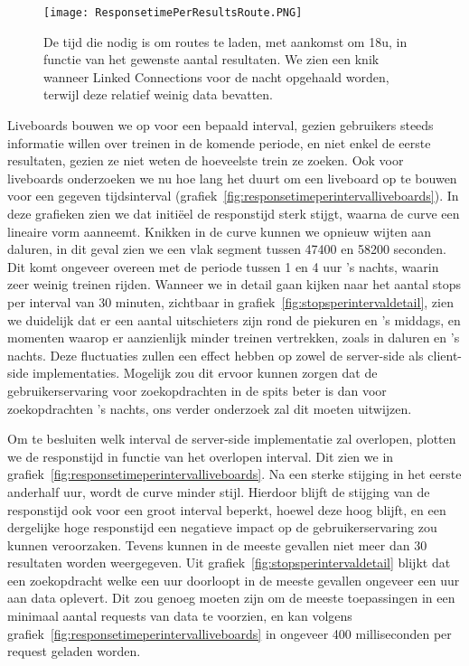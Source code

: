 \begin{figure}[h]
	\centering
	\texttt{[image: ResponsetimePerResultsRoute.PNG]}
	\caption[Laadtijd routes in functie van aantal resultaten]{De tijd die nodig is om routes te laden, met aankomst om 18u, in functie van het gewenste aantal resultaten. We zien een knik wanneer Linked Connections voor de nacht opgehaald worden, terwijl deze relatief weinig data bevatten.}
	\label{fig:responsetimeperresultsroute}
\end{figure}

Liveboards bouwen we op voor een bepaald interval, gezien gebruikers steeds informatie willen over treinen in de komende periode, en niet enkel de eerste resultaten, gezien ze niet weten de hoeveelste trein ze zoeken. Ook voor liveboards onderzoeken we nu hoe lang het duurt om een liveboard op te bouwen voor een gegeven tijdsinterval (grafiek~\ref{fig:responsetimeperintervalliveboards}). In deze grafieken zien we dat initiëel de responstijd sterk stijgt, waarna de curve een lineaire vorm aanneemt. Knikken in de curve kunnen we opnieuw wijten aan daluren, in dit geval zien we een vlak segment tussen 47400 en 58200 seconden. Dit komt ongeveer overeen met de periode tussen 1 en 4 uur 's nachts, waarin zeer weinig treinen rijden. Wanneer we in detail gaan kijken naar het aantal stops per interval van 30 minuten, zichtbaar in grafiek~\ref{fig:stopsperintervaldetail}, zien we duidelijk dat er een aantal uitschieters zijn rond de piekuren en 's middags, en momenten waarop er aanzienlijk minder treinen vertrekken, zoals in daluren en 's nachts. Deze fluctuaties zullen een effect hebben op zowel de server-side als client-side implementaties. Mogelijk zou dit ervoor kunnen zorgen dat de gebruikerservaring voor zoekopdrachten in de spits beter is dan voor zoekopdrachten 's nachts, ons verder onderzoek zal dit moeten uitwijzen.

Om te besluiten welk interval de server-side implementatie zal overlopen, plotten we de responstijd in functie van het overlopen interval. Dit zien we in grafiek~\ref{fig:responsetimeperintervalliveboards}. Na een sterke stijging in het eerste anderhalf uur, wordt de curve minder stijl. Hierdoor blijft de stijging van de responstijd ook voor een groot interval beperkt, hoewel deze hoog blijft, en een dergelijke hoge responstijd een negatieve impact op de gebruikerservaring zou kunnen veroorzaken. Tevens kunnen in de meeste gevallen niet meer dan 30 resultaten worden weergegeven. Uit grafiek~\ref{fig:stopsperintervaldetail} blijkt dat een zoekopdracht welke een uur doorloopt in de meeste gevallen ongeveer een uur aan data oplevert. Dit zou genoeg moeten zijn om de meeste toepassingen in een minimaal aantal requests van data te voorzien, en kan volgens grafiek~\ref{fig:responsetimeperintervalliveboards} in ongeveer 400 milliseconden per request geladen worden.

